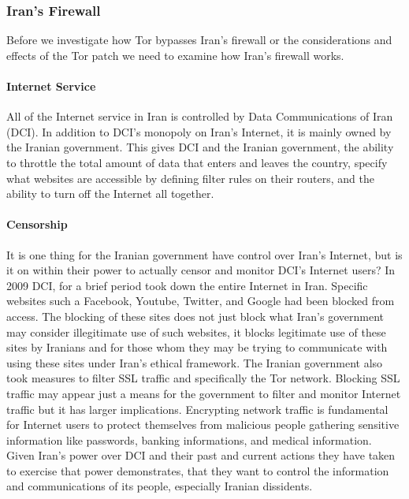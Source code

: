 \documentclass[11pt]{article}
\begin{document}
\begin{multicols}{2}
\subsubsection{Iran's Firewall}
Before we investigate how Tor bypasses Iran's firewall or the considerations and
effects of the Tor patch we need to examine how Iran's firewall works.

\paragraph{Internet Service}

All of the Internet service in Iran is controlled by Data Communications of Iran
(DCI).\cite{FindingWayAroundIranianCensorship} In addition to DCI's monopoly on
Iran's Internet, it is mainly owned by the Iranian government.\cite{
FindingWayAroundIranianCensorship, DCI:Articles} This gives DCI and the
Iranian government, the ability to throttle the total amount of data that enters
and leaves the country, specify what websites are accessible by defining filter
rules on their routers, and the ability to turn off the Internet all together.
\cite{FindingWayAroundIranianCensorship}

\paragraph{Censorship} 

It is one thing for the Iranian government have control over Iran's
Internet, but is it on within their power to actually censor and monitor DCI's
Internet users? In 2009 DCI, for a brief period took down the entire Internet in 
Iran.\cite{FindingWayAroundIranianCensorship} Specific websites such a
Facebook, Youtube, Twitter, and Google had been blocked from access.\cite{
FindingWayAroundIranianCensorship, IransElectronicCurtain} The blocking of
these sites does not just block what Iran's government may consider illegitimate
use of such websites, it  blocks legitimate use of these sites by Iranians and
for those whom they may be trying to communicate with using these sites under
Iran's ethical framework. The Iranian government also took measures to filter
SSL traffic and specifically the Tor network.\cite{Tor:IranPartiallyBlocksSSL,
IranBlocksTorSameDayFix} Blocking SSL traffic may appear just a means for the
government to filter and monitor Internet traffic but it has larger
implications. Encrypting network traffic is fundamental for Internet users to
protect themselves from malicious people gathering sensitive information like
passwords, banking informations, and medical information. Given Iran's power
over DCI and their past and current actions they have taken to exercise that
power demonstrates, that they want to control the information and communications
of its people, especially Iranian dissidents.



\end{multicols}
\end{document}
